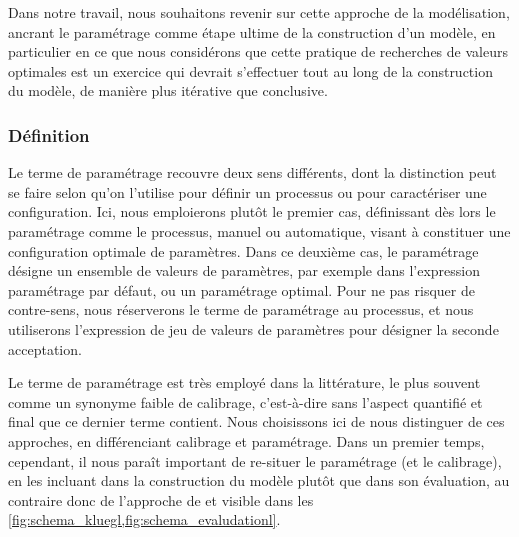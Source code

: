 Dans notre travail, nous souhaitons revenir sur cette approche de la modélisation, ancrant le paramétrage comme étape ultime de la construction d'un modèle, en particulier en ce que nous considérons que cette pratique de recherches de valeurs optimales est un exercice qui devrait s'effectuer tout au long de la construction du modèle, de manière plus itérative que conclusive.

\subsubsection{Définition \label{sssec:definition-parametrage}}

Le terme de paramétrage recouvre deux sens différents, dont la distinction peut se faire selon qu'on l'utilise pour définir un processus ou pour caractériser une configuration.
Ici, nous emploierons plutôt le premier cas, définissant dès lors le paramétrage comme le processus, manuel ou automatique, visant à constituer une configuration optimale de paramètres.
Dans ce deuxième cas, le paramétrage désigne un ensemble de valeurs de paramètres, par exemple dans l'expression \og paramétrage par défaut\fg{}, ou un paramétrage optimal.
Pour ne pas risquer de contre-sens, nous réserverons le terme de paramétrage au processus, et nous utiliserons l'expression de \og jeu de valeurs de paramètres\fg{} pour désigner la seconde acceptation.

Le terme de paramétrage est très employé dans la littérature, le plus souvent comme un synonyme \og faible\fg{} de calibrage, c'est-à-dire sans l'aspect quantifié et \og final\fg{} que ce dernier terme contient.
Nous choisissons ici de nous distinguer de ces approches, en différenciant calibrage et paramétrage.
Dans un premier temps, cependant, il nous paraît important de re-situer le paramétrage (et le calibrage), en les incluant dans la construction du modèle plutôt que dans son évaluation, au contraire donc de l'approche de \textcite{klugl_validation_2008} et \textcite{ngo_calibration_2012} visible dans les \cref{fig:schema_kluegl,fig:schema_evaludationl}.

